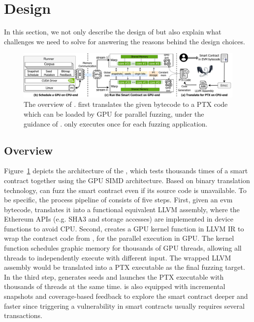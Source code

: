 \section{Design}
In this section, we not only describe the design of  {\tool} but also explain what challenges we need to solve for answering the reasons behind the design choices.  

\begin{figure}[t]
\centerline{\includegraphics[width=\textwidth]{images/GFL-overview.drawio.pdf}}
\caption{The overview of {\tool}. {\translator} first translates the given bytecode to a PTX code which can be loaded by GPU for parallel fuzzing, under the guidance of {\runner}. {\translator} only executes once for each fuzzing application.}
\vspace{-0.1in}
\label{fig:overview}
\end{figure}


\subsection{Overview}
Figure~\ref{fig:overview} depicts the architecture of the {\tool}, which tests thousands times of a smart contract together using the GPU SIMD architecture.
Based on binary translation technology, {\tool} can fuzz the smart contract even if its source code is unavailable.
%
To be specific, the process pipeline of {\tool} consists of five steps. 
%
First, given an evm bytecode, {\translator} translates it into a functional equivalent LLVM assembly, where the Ethereum APIs (e.g. SHA3 and storage accesses) are implemented in device functions to avoid CPU.
%
Second, {\wrapper} creates a GPU kernel function in LLVM IR to wrap the contract code from {\translator}, for the parallel execution in GPU. The kernel function schedules graphic memory for thousands of GPU threads, allowing all threads to independently execute with different input. The wrapped LLVM assembly would be translated into a PTX executable as the final fuzzing target. 
%
In the third step, {\runner} generates seeds and launches the PTX executable with thousands of threads at the same time. {\runner} is also equipped with incremental snapshots and coverage-based feedback to explore the smart contract deeper and faster since triggering a vulnerability in smart contracts usually requires several transactions\cite{TBD}. 

